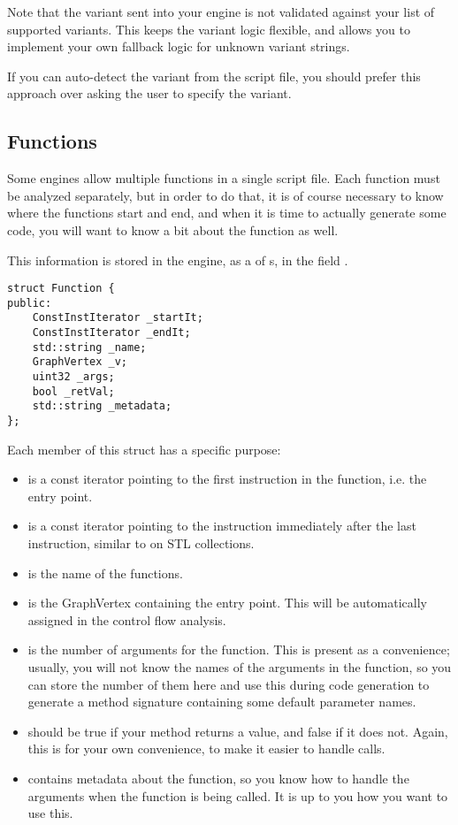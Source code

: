 Note that the variant sent into your engine is not validated against your list of supported variants. This keeps the variant logic flexible, and allows you to implement your own fallback logic for unknown variant strings.

If you can auto-detect the variant from the script file, you should prefer this approach over asking the user to specify the variant.

\subsection{Functions}
Some engines allow multiple functions in a single script file. Each function must be analyzed separately, but in order to do that, it is of course necessary to know where the functions start and end, and when it is time to actually generate some code, you will want to know a bit about the function as well.

This information is stored in the engine, as a  of s, in the field .

\begin{C++}
\begin{lstlisting}
struct Function {
public:
	ConstInstIterator _startIt;
	ConstInstIterator _endIt;
	std::string _name;
	GraphVertex _v;
	uint32 _args;
	bool _retVal;
	std::string _metadata;
};
\end{lstlisting}
\end{C++}

Each member of this struct has a specific purpose:
\begin{itemize}
\item {} is a const iterator pointing to the first instruction in the function, i.e. the entry point.
\item {} is a const iterator pointing to the instruction immediately after the last instruction, similar to  on STL collections.
\item {} is the name of the functions.
\item {} is the GraphVertex containing the entry point. This will be automatically assigned in the control flow analysis.
\item {} is the number of arguments for the function. This is present as a convenience; usually, you will not know the names of the arguments in the function, so you can store the number of them here and use this during code generation to generate a method signature containing some default parameter names.
\item {} should be true if your method returns a value, and false if it does not. Again, this is for your own convenience, to make it easier to handle calls.
\item {} contains metadata about the function, so you know how to handle the arguments when the function is being called. It is up to you how you want to use this.
\end{itemize}

